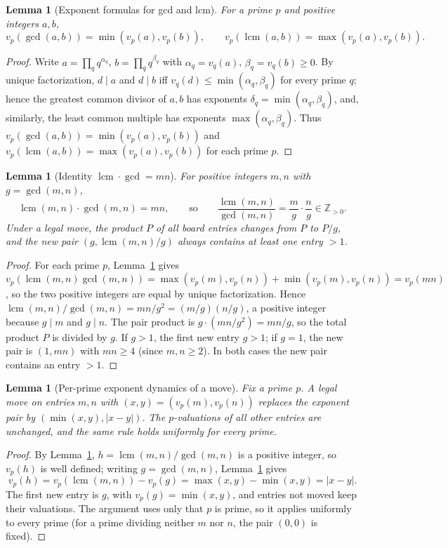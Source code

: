\documentclass{article}
\newtheorem{lemma}[theorem]{Lemma}
\DeclareMathOperator{\lcm}{lcm}
\begin{document}
\begin{lemma}[Exponent formulas for gcd and lcm]\label{lem:vpgcd}
For a prime $p$ and positive integers $a,b$,
\[
v_p(\gcd(a,b))=\min(v_p(a),v_p(b)),\qquad
v_p(\lcm(a,b))=\max(v_p(a),v_p(b)).
\]
\end{lemma}
\begin{proof}
Write $a=\prod_q q^{\alpha_q}$, $b=\prod_q q^{\beta_q}$ with $\alpha_q=v_q(a)$,
$\beta_q=v_q(b)\geq 0$. By unique factorization, $d\mid a$ and $d\mid b$ iff
$v_q(d)\leq\min(\alpha_q,\beta_q)$ for every prime $q$; hence the greatest common divisor of
$a,b$ has exponents $\delta_q=\min(\alpha_q,\beta_q)$, and, similarly, the least common
multiple has exponents $\max(\alpha_q,\beta_q)$. Thus
$v_p(\gcd(a,b))=\min(v_p(a),v_p(b))$ and $v_p(\lcm(a,b))=\max(v_p(a),v_p(b))$ for each prime $p$.
\end{proof}

\begin{lemma}[Identity $\lcm\cdot\gcd=mn$]\label{lem:lcmgcd}
For positive integers $m,n$ with $g=\gcd(m,n)$,
\[
\lcm(m,n)\cdot\gcd(m,n)=mn,\qquad\text{so}\qquad \frac{\lcm(m,n)}{\gcd(m,n)}=\frac{m}{g}\cdot\frac{n}{g}\in\mathbb{Z}_{>0}.
\]
Under a legal move, the product $P$ of all board entries changes from $P$ to $P/g$,
and the new pair $(g,\lcm(m,n)/g)$ always contains at least one entry $>1$.
\end{lemma}
\begin{proof}
For each prime $p$, Lemma~\ref{lem:vpgcd} gives
$v_p(\lcm(m,n)\gcd(m,n))=\max(v_p(m),v_p(n))+\min(v_p(m),v_p(n))=v_p(mn)$, so the two positive
integers are equal by unique factorization. Hence
$\lcm(m,n)/\gcd(m,n)=mn/g^2=(m/g)(n/g)$, a positive integer because $g\mid m$ and $g\mid n$.
The pair product is $g\cdot(mn/g^2)=mn/g$, so the total product $P$ is divided by $g$.
If $g>1$, the first new entry $g>1$; if $g=1$, the new pair is $(1,mn)$ with $mn\geq 4$
(since $m,n\geq 2$). In both cases the new pair contains an entry $>1$.
\end{proof}

\begin{lemma}[Per-prime exponent dynamics of a move]\label{lem:expdyn}
Fix a prime $p$. A legal move on entries $m,n$ with $(x,y)=(v_p(m),v_p(n))$ replaces
the exponent pair by $(\min(x,y),|x-y|)$. The $p$-valuations of all other entries are
unchanged, and the same rule holds uniformly for every prime.
\end{lemma}
\begin{proof}
By Lemma~\ref{lem:lcmgcd}, $h=\lcm(m,n)/\gcd(m,n)$ is a positive integer, so $v_p(h)$ is well
defined; writing $g=\gcd(m,n)$, Lemma~\ref{lem:vpgcd} gives
\[
v_p(h)=v_p(\lcm(m,n))-v_p(g)=\max(x,y)-\min(x,y)=|x-y|.
\]
The first new entry is $g$, with $v_p(g)=\min(x,y)$, and entries not moved keep their
valuations. The argument uses only that $p$ is prime, so it applies uniformly to every
prime (for a prime dividing neither $m$ nor $n$, the pair $(0,0)$ is fixed).
\end{proof}
\end{document}
